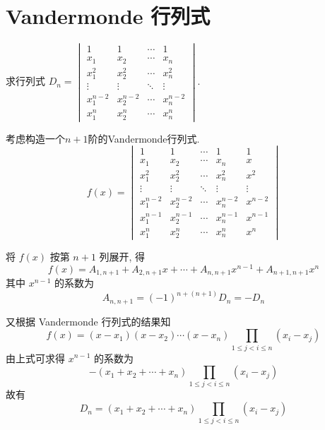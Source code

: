 \section{Vandermonde 行列式}

\begin{example}
    求行列式 $D_n=\begin{vmatrix}
            1         & 1         & \cdots & 1         \\
            x_1       & x_2       & \cdots & x_n       \\
            x_1^{2}   & x_2^{2}   & \cdots & x_n^{2}   \\
            \vdots    & \vdots    & \ddots & \vdots    \\
            x_1^{n-2} & x_2^{n-2} & \cdots & x_n^{n-2} \\
            x_1^{n}   & x_2^{n}   & \cdots & x_n^{n}
        \end{vmatrix}$.
\end{example}

\begin{solution}
    考虑构造一个$n+1$阶的Vandermonde行列式.
    \[ f(x)=\begin{vmatrix}
            1         & 1         & \cdots & 1         & 1       \\
            x_1       & x_2       & \cdots & x_n       & x       \\
            x_1^{2}   & x_2^{2}   & \cdots & x_n^{2}   & x^{2}   \\
            \vdots    & \vdots    & \ddots & \vdots    & \vdots  \\
            x_1^{n-2} & x_2^{n-2} & \cdots & x_n^{n-2} & x^{n-2} \\
            x_1^{n-1} & x_2^{n-1} & \cdots & x_n^{n-1} & x^{n-1} \\
            x_1^{n}   & x_2^{n}   & \cdots & x_n^{n}   & x^{n}
        \end{vmatrix} \]

    将 $f(x)$ 按第 $n+1$ 列展开, 得
    \[ f(x)=A_{1, n+1}+A_{2, n+1} x+\cdots+A_{n, n+1} x^{n-1}+A_{n+1, n+1} x^{n} \]
    其中 $x^{n-1}$ 的系数为
    \[ A_{n, n+1}=(-1)^{n+(n+1)} D_n=-D_n \]

    又根据 Vandermonde 行列式的结果知
    \[ f(x)=(x-x_1)(x-x_2)\cdots(x-x_n) \prod_{1 \leqslant j<i \leqslant n}(x_i-x_j) \]
    由上式可求得 $x^{n-1}$ 的系数为
    \[ -(x_1+x_2+\cdots+x_n) \prod_{1 \leqslant j<i \leqslant n}(x_i-x_j) \]
    故有
    \[ D_n=(x_1+x_2+\cdots+x_n) \prod_{1 \leqslant j<i \leqslant n}(x_i-x_j) \]
\end{solution}

